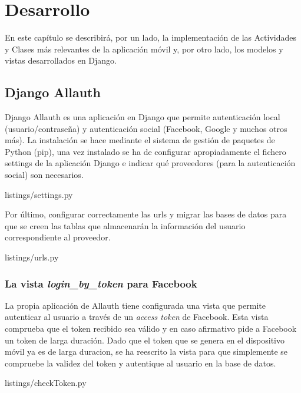 %
%
%
%
\chapter{Desarrollo} \label{chap:Desarrollo}  

En este capítulo se describirá, por un lado, la implementación de las 
Actividades y Clases más relevantes de la aplicación móvil y, por otro lado, los 
modelos y vistas desarrollados en Django.

\section{Django Allauth}

Django Allauth \cite{URL::allauth} es una aplicación en Django
que permite autenticación local (usuario/contraseña) y autenticación social 
(Facebook, Google y muchos otros más). La instalación se hace mediante el 
sistema de gestión de paquetes de Python (pip), 
una vez instalado se ha de configurar apropiadamente el fichero settings de la 
aplicación Django e indicar qué proveedores (para la autenticación social) son 
necesarios. 


{listings/settings.py}

Por último, configurar correctamente las urls y migrar las bases de 
datos para que se creen las tablas que almacenarán la información del usuario
correspondiente al proveedor. 


{listings/urls.py} %

\subsection{La vista \textit{login\_by\_token} para Facebook}
La propia aplicación de Allauth tiene configurada una vista que permite autenticar al usuario a través de un \textit{access token} de Facebook. Esta vista comprueba que el token recibido sea válido y en caso afirmativo pide a Facebook un token de larga duración. Dado que el token que se genera en el dispositivo móvil ya es de larga duracion, se ha reescrito la vista para que simplemente se compruebe la validez del token y autentique al usuario en la base de datos.  
\newline

{listings/checkToken.py} %

